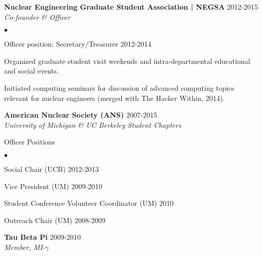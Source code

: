 \documentclass[margin,line]{res}
\newenvironment{list1}{
  \begin{list}{\ding{113}}{%
      \setlength{\itemsep}{0in}
      \setlength{\parsep}{0in} \setlength{\parskip}{0in}
      \setlength{\topsep}{0in} \setlength{\partopsep}{0in} 
      \setlength{\leftmargin}{0.17in}}}{\end{list}}
\newenvironment{list2}{
  \begin{list}{$\bullet$}{%
      \setlength{\itemsep}{0in}
      \setlength{\parsep}{0in} \setlength{\parskip}{0in}
      \setlength{\topsep}{0in} \setlength{\partopsep}{0in} 
      \setlength{\leftmargin}{0.2in}}}{\end{list}}
\begin{document}
\begin{resume}
{\bf Nuclear Engineering Graduate Student Association | NEGSA} \hfill 2012-2015\\
{\em Co-founder \& Officer} 

\begin{list2}
  \item Officer position: Secretary/Treasurer \hfill 2012-2014
  \item Organized graduate student visit weekends and intra-departmental 
        educational and social events.
  \item Initiated computing seminars for discussion of advanced computing 
        topics relevant for nuclear engineers (merged with The Hacker Within,
        2014).
\end{list2}

{\bf American Nuclear Society (ANS)} \hfill 2007-2015 \\
{\em University of Michigan \& UC Berkeley Student Chapters} 

\begin{list1}
  \item[] Officer Positions
  \begin{list2}
    \item Social Chair (UCB) \hfill 2012-2013
    \item Vice President (UM) \hfill 2009-2010
    \item Student Conference Volunteer Coordinator (UM) \hfill 2010
    \item Outreach Chair (UM) \hfill 2008-2009
  \end{list2}
\end{list1}

{\bf Tau Beta Pi} \hfill 2009-2010 \\
{\em Member, MI-$\gamma$} 

%

\end{resume}
\end{document}
